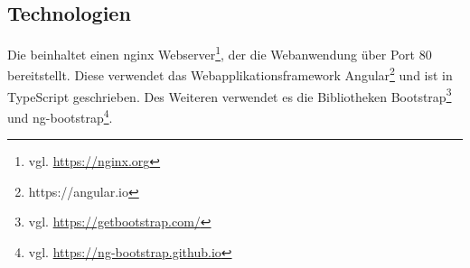 \subsection{Technologien}
    Die {\webAppService} beinhaltet einen nginx Webserver\footnote{vgl. \url{https://nginx.org}},
    der die Webanwendung über Port 80 bereitstellt.
    Diese verwendet das Webapplikationsframework Angular\footnote{https://angular.io}
    und ist in TypeScript geschrieben.
    Des Weiteren verwendet es die Bibliotheken
    Bootstrap\footnote{vgl. \url{https://getbootstrap.com/}}
    und ng-bootstrap\footnote{vgl. \url{https://ng-bootstrap.github.io}}.
